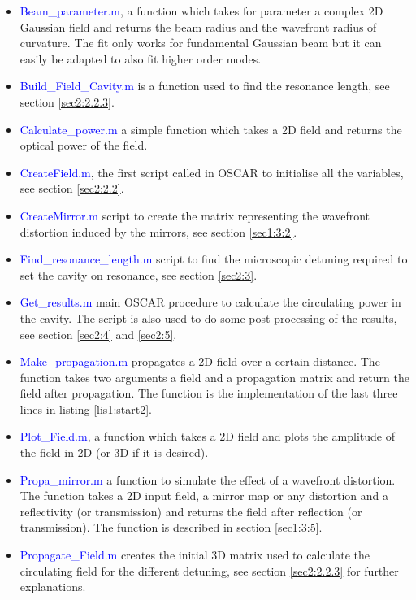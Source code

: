 \begin{itemize}
  \item \textcolor{blue}{Beam\_parameter.m}, a function which takes for parameter a complex 2D Gaussian field and returns the beam radius and the wavefront radius of curvature. The fit only works for fundamental Gaussian beam but it can easily be adapted to also fit higher order modes.
  \item \textcolor{blue}{Build\_Field\_Cavity.m} is a function used to find the resonance length, see section \ref{sec2:2.2.3}.
  \item \textcolor{blue}{Calculate\_power.m} a simple function which takes a 2D field and returns the optical power of the field.
  \item \textcolor{blue}{CreateField.m}, the first script called in OSCAR to initialise all the variables, see section \ref{sec2:2.2}.
  \item \textcolor{blue}{CreateMirror.m} script to create the matrix representing the wavefront distortion induced by the mirrors, see section \ref{sec1:3:2}.
  \item \textcolor{blue}{Find\_resonance\_length.m} script to find the microscopic detuning required to set the cavity on resonance, see section \ref{sec2:3}.
  \item \textcolor{blue}{Get\_results.m} main OSCAR procedure to calculate the circulating power in the cavity. The script is also used to do some post processing of the results, see section \ref{sec2:4} and \ref{sec2:5}.
  \item \textcolor{blue}{Make\_propagation.m} propagates a 2D field over a certain distance. The function takes two arguments a field and a propagation matrix and return the field after propagation. The function is the implementation of the last three lines in listing \ref{lis1:start2}.
  \item \textcolor{blue}{Plot\_Field.m}, a function which takes a 2D field and plots the amplitude of the field in 2D (or 3D if it is desired).
  \item \textcolor{blue}{Propa\_mirror.m} a function to simulate the effect of a wavefront distortion. The function takes a 2D input field, a mirror map or any distortion and a reflectivity (or transmission) and returns the field after reflection (or transmission). The function is described in section \ref{sec1:3:5}.
  \item \textcolor{blue}{Propagate\_Field.m} creates the initial 3D matrix used to calculate the circulating field for the different detuning, see section \ref{sec2:2.2.3} for further explanations.
\end{itemize}



